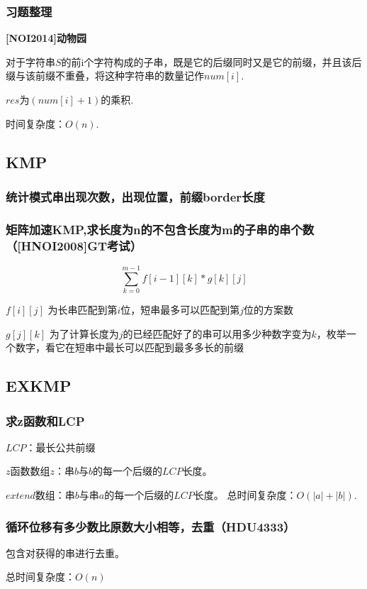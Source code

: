 \documentclass{article}
\begin{document}
\subsubsection{习题整理}
\textbf{[NOI2014]动物园}\par
对于字符串$S$的前i个字符构成的子串，既是它的后缀同时又是它的前缀，并且该后缀与该前缀不重叠，将这种字符串的数量记作$num[i]$.\par
$res$为$(num[i]+1)$的乘积.\par
时间复杂度：$O(n).$


\subsection{KMP}
\subsubsection{统计模式串出现次数，出现位置，前缀border长度}

\subsubsection{矩阵加速KMP,求长度为n的不包含长度为m的子串的串个数（[HNOI2008]GT考试）}
$$\sum_{k=0}^{m-1}f[i-1][k]\ast g[k][j]$$\par
$f[i][j]$ 为长串匹配到第$i$位，短串最多可以匹配到第$j$位的方案数\par
$g[j][k]$ 为了计算长度为$j$的已经匹配好了的串可以用多少种数字变为$k$，枚举一个数字，看它在短串中最长可以匹配到最多多长的前缀\par


\subsection{EXKMP}
\subsubsection{求z函数和LCP}
$LCP$：最长公共前缀\par
$z$函数数组$z$：串$b$与$b$的每一个后缀的$LCP$长度。\par
$extend$数组：串$b$与串$a$的每一个后缀的$LCP$长度。
总时间复杂度：$O(|a|+|b|)$.

\subsubsection{循环位移有多少数比原数大小相等，去重（HDU4333）}
包含对获得的串进行去重。\par
总时间复杂度：$O(n)$

\end{document}
